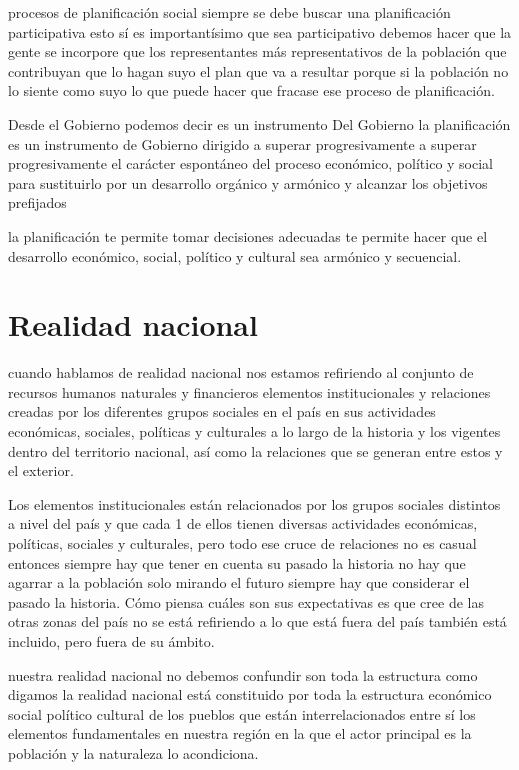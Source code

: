 \documentclass[
  jou,
  floatsintext,
  longtable,
  a4paper,
  nolmodern,
  notxfonts,
  notimes,
  12pt,
  colorlinks=true,linkcolor=blue,citecolor=blue,urlcolor=blue]{apa7}
\begin{document}
procesos de planificación social siempre se debe buscar una
planificación participativa esto sí es importantísimo que sea
participativo debemos hacer que la gente se incorpore que los
representantes más representativos de la población que contribuyan que
lo hagan suyo el plan que va a resultar porque si la población no lo
siente como suyo lo que puede hacer que fracase ese proceso de
planificación.

Desde el Gobierno podemos decir es un instrumento Del Gobierno la
planificación es un instrumento de Gobierno dirigido a superar
progresivamente a superar progresivamente el carácter espontáneo del
proceso económico, político y social para sustituirlo por un desarrollo
orgánico y armónico y alcanzar los objetivos prefijados

la planificación te permite tomar decisiones adecuadas te permite hacer
que el desarrollo económico, social, político y cultural sea armónico y
secuencial.

\section{Realidad nacional}\label{realidad-nacional}

cuando hablamos de realidad nacional nos estamos refiriendo al conjunto
de recursos humanos naturales y financieros elementos institucionales y
relaciones creadas por los diferentes grupos sociales en el país en sus
actividades económicas, sociales, políticas y culturales a lo largo de
la historia y los vigentes dentro del territorio nacional, así como la
relaciones que se generan entre estos y el exterior.

Los elementos institucionales están relacionados por los grupos sociales
distintos a nivel del país y que cada 1 de ellos tienen diversas
actividades económicas, políticas, sociales y culturales, pero todo ese
cruce de relaciones no es casual entonces siempre hay que tener en
cuenta su pasado la historia no hay que agarrar a la población solo
mirando el futuro siempre hay que considerar el pasado la historia. Cómo
piensa cuáles son sus expectativas es que cree de las otras zonas del
país no se está refiriendo a lo que está fuera del país también está
incluido, pero fuera de su ámbito.

nuestra realidad nacional no debemos confundir son toda la estructura
como digamos la realidad nacional está constituido por toda la
estructura económico social político cultural de los pueblos que están
interrelacionados entre sí los elementos fundamentales en nuestra región
en la que el actor principal es la población y la naturaleza lo
acondiciona.
\end{document}
